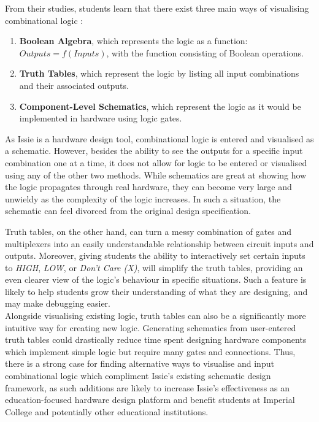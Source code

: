From their studies, students learn that there exist three main ways of visualising combinational logic  \cite{visualise_boolean}: 
\begin{enumerate}
    \item \textbf{Boolean Algebra}, which represents the logic as a function: $Outputs = f(Inputs)$, with the function consisting of Boolean operations.
    \item \textbf{Truth Tables}, which represent the logic by listing all input combinations and their associated outputs.
    \item \textbf{Component-Level Schematics}, which represent the logic as it would be implemented in hardware using logic gates.
\end{enumerate}

As Issie is a hardware design tool, combinational logic is entered and visualised as a schematic. However, besides the ability to see the outputs for a specific input combination one at a time, it does not allow for logic to be entered or visualised using any of the other two methods. While schematics are great at showing how the logic propagates through real hardware, they can become very large and unwieldy as the complexity of the logic increases. In such a situation, the schematic can feel divorced from the original design specification.

Truth tables, on the other hand, can turn a messy combination of gates and multiplexers into an easily understandable relationship between circuit inputs and outputs. Moreover, giving students the ability to interactively set certain inputs to \textit{HIGH}, \textit{LOW}, or \textit{Don't Care (X)}, will simplify the truth tables, providing an even clearer view of the logic's behaviour in specific situations. Such a feature is likely to help students grow their understanding of what they are designing, and may make debugging easier. \\
Alongside visualising existing logic, truth tables can also be a significantly more intuitive way for creating new logic. Generating schematics from user-entered truth tables could drastically reduce time spent designing hardware components which implement simple logic but require many gates and connections. 
Thus, there is a strong case for finding alternative ways to visualise and input combinational logic which compliment Issie's existing schematic design framework, as such additions are likely to increase Issie's effectiveness as an education-focused hardware design platform and benefit students at Imperial College and potentially other educational institutions.